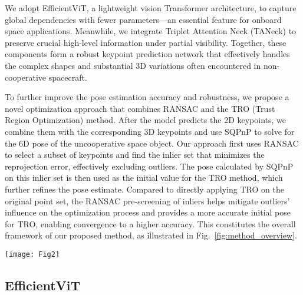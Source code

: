 \documentclass[a4paper,fleqn]{cas-sc}
\begin{document}
We adopt EfficientViT, a lightweight vision Transformer architecture, to capture global dependencies with fewer parameters---an essential feature for onboard space applications. Meanwhile, we integrate Triplet Attention Neck (TANeck) to preserve crucial high-level information under partial visibility. Together, these components form a robust keypoint prediction network that effectively handles the complex shapes and substantial 3D variations often encountered in non-cooperative spacecraft.


To further improve the pose estimation accuracy and robustness, we propose a novel optimization approach that combines RANSAC and the TRO (Trust Region Optimization) \citep{coleman1996interior} method. After the model predicts the 2D keypoints, we combine them with the corresponding 3D keypoints and use SQPnP \citep{terzakis2020consistently} to solve for the 6D pose of the uncooperative space object. Our approach first uses RANSAC to select a subset of keypoints and find the inlier set that minimizes the reprojection error, effectively excluding outliers. The pose calculated by SQPnP on this inlier set is then used as the initial value for the TRO method, which further refines the pose estimate. Compared to directly applying TRO on the original point set, the RANSAC pre-screening of inliers helps mitigate outliers' influence on the optimization process and provides a more accurate initial pose for TRO, enabling convergence to a higher accuracy. This constitutes the overall framework of our proposed method, as illustrated in Fig.~\ref{fig:method_overview}.

\begin{figure*}[!htbp]
	\centering	
	\texttt{[image: Fig2]}
	\caption{Overview of the proposed method and its main components. (a) The overall pipeline of the method. (b) Architecture of EfficientViT Block. H$_i$ ($i$ from 1 to $n$) represents the $i$-th self-attention head, FFN represents the feed-forward network. (c) Structure of Triplet Attention. R$_{wc}$, R$_{cw}$, R$_{hc}$, R$_{ch}$ represent wide channel permutation, channel wide permutation, height channel permutation, and channel height permutation respectively, Avg represents average.}
	\label{fig:method_overview}
\end{figure*}

\subsection{EfficientViT}
\end{document}
